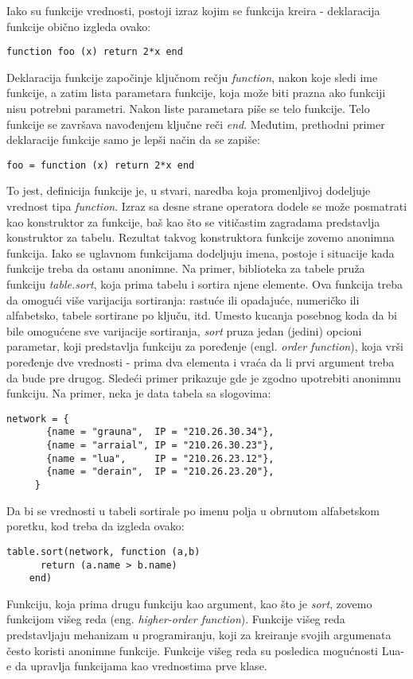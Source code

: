 \documentclass[a4paper]{article}
\begin{document}
Iako su funkcije vrednosti, postoji izraz kojim se funkcija kreira - deklaracija funkcije obično izgleda ovako:
\begin{lstlisting}[caption={Deklaracija funkcije \cite{bookProgInLua}},frame=single, label=fun1]
    function foo (x) return 2*x end
\end{lstlisting}
Deklaracija funkcije započinje ključnom rečju \textit{function}, nakon koje sledi ime funkcije, a zatim lista parametara funkcije, koja može biti prazna ako funkciji nisu potrebni parametri. Nakon liste parametara piše se telo funkcije. Telo funkcije se završava navođenjem ključne reči \textit{end}.
Međutim, prethodni primer deklaracije funkcije samo je lepši način da se zapiše:
\begin{lstlisting}[caption={Dodela vrednosti tipa \textit{function} promenljivoj foo \cite{bookProgInLua}},frame=single, label=fun1]
    foo = function (x) return 2*x end
\end{lstlisting}
To jest, definicija funkcije je, u stvari, naredba koja promenljivoj dodeljuje vrednost tipa \textit{function}. Izraz sa desne strane operatora dodele se može posmatrati kao konstruktor za funkcije, baš kao što se vitičastim zagradama predstavlja konstruktor za tabelu. Rezultat takvog konstruktora funkcije zovemo anonimna funkcija. Iako se uglavnom funkcijama dodeljuju imena, postoje i situacije kada funkcije treba da ostanu anonimne. Na primer, biblioteka za tabele pruža funkciju \textit{table.sort}, koja prima tabelu i sortira njene elemente. Ova funkcija treba da omogući više varijacija sortiranja: rastuće ili opadajuće, numeričko ili alfabetsko, tabele sortirane po ključu, itd. Umesto kucanja posebnog koda da bi bile omogućene sve varijacije sortiranja, \textit{sort} pruza jedan (jedini) opcioni parametar, koji predstavlja funkciju za poređenje (engl. \textit{order function}), koja vrši poređenje dve vrednosti - prima dva elementa i vraća da li prvi argument treba da bude pre drugog. Sledeći primer prikazuje gde je zgodno upotrebiti anonimnu funkciju. Na primer, neka je data tabela sa slogovima:
\begin{lstlisting}[caption={Primer tabele \cite{bookProgInLua}},frame=single, label=fun2]
     network = {
       {name = "grauna",  IP = "210.26.30.34"},
       {name = "arraial", IP = "210.26.30.23"},
       {name = "lua",     IP = "210.26.23.12"},
       {name = "derain",  IP = "210.26.23.20"},
     }
\end{lstlisting}
Da bi se vrednosti u tabeli sortirale po imenu polja u obrnutom alfabetskom poretku, kod treba da izgleda ovako:
\begin{lstlisting}[caption={Sortiranje vrednosti tabele \cite{bookProgInLua}},frame=single, label=fun3]
    table.sort(network, function (a,b)
      return (a.name > b.name)
    end)
\end{lstlisting}
Funkciju, koja prima drugu funkciju kao argument, kao što je \textit{sort}, zovemo funkcijom višeg reda (eng. \textit{higher-order function}). Funkcije višeg reda predstavljaju mehanizam u programiranju, koji za kreiranje svojih argumenata često koristi anonimne funkcije. Funkcije višeg reda su posledica mogućnosti Lua-e da upravlja funkcijama kao vrednostima prve klase.
\end{document}
